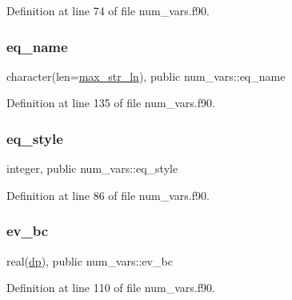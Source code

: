 Definition at line 74 of file num\+\_\+vars.\+f90.

\mbox{\label{namespacenum__vars_a3cc0fc4b1538f7203be1604cb4f7c9bc}} 
\subsubsection{\texorpdfstring{eq\+\_\+name}{eq\_name}}
{\footnotesize\ttfamily character(len=\hyperlink{namespacenum__vars_a3ff2bb983ee80a6735277d6789e6ce7c}{max\+\_\+str\+\_\+ln}), public num\+\_\+vars\+::eq\+\_\+name}



Definition at line 135 of file num\+\_\+vars.\+f90.

\mbox{\label{namespacenum__vars_a7d8763402037dbb80db19e2534ddf595}} 
\subsubsection{\texorpdfstring{eq\+\_\+style}{eq\_style}}
{\footnotesize\ttfamily integer, public num\+\_\+vars\+::eq\+\_\+style}



Definition at line 86 of file num\+\_\+vars.\+f90.

\mbox{\label{namespacenum__vars_a4efc3cca2482236a18b8927bca8361c2}} 
\subsubsection{\texorpdfstring{ev\+\_\+bc}{ev\_bc}}
{\footnotesize\ttfamily real(\hyperlink{namespacenum__vars_a03802aa2bd86439d7a9370836fabf3f2}{dp}), public num\+\_\+vars\+::ev\+\_\+bc}



Definition at line 110 of file num\+\_\+vars.\+f90.

\mbox{\label{namespacenum__vars_a4c19f47e50c92bfd52985761500a999e}} 
